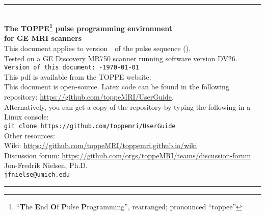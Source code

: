 

\begin{titlepage}
~\\[0.5in]
\begin{centering}
\rule{\textwidth}{5pt}
~\\[0.5in]
{\bf \huge The TOPPE\footnote{``\textbf{T}he \textbf{E}nd \textbf{O}f \textbf{P}ulse \textbf{P}rogramming'', rearranged; pronounced ``toppee''} pulse programming environment} \\ [0.4in]
{\bf \huge for GE MRI scanners} \\ [0.6in]
{This document applies to version~\toppeversion~of the pulse sequence (\toppe).   } \\ [0.1in]
{Tested on a GE Discovery MR750 scanner running software version DV26.   } \\ [0.3in]
{\tt Version of this document:~\toppeversion-\today} \\ [0.3in]
This pdf is available from the TOPPE website: \toppeweb \\ [0.2in]
This document is open-source. Latex code can be found in the following repository: \url{https://github.com/toppeMRI/UserGuide}. \\
Alternatively, you can get a copy of the repository by typing the following in a Linux console:\\
{\tt git clone https://github.com/toppemri/UserGuide} \\ [0.2in]
{Other resources:} \\
{Wiki: \url{https://github.com/toppeMRI/toppemri.github.io/wiki}} \\
{Discussion forum: \url{https://github.com/orgs/toppeMRI/teams/discussion-forum} } \\ [0.3in]
{Jon-Fredrik Nielsen, Ph.D.} \\
{\tt jfnielse@umich.edu} \\ [0.5in]
\rule{\textwidth}{5pt}
\end{centering}
\end{titlepage}


